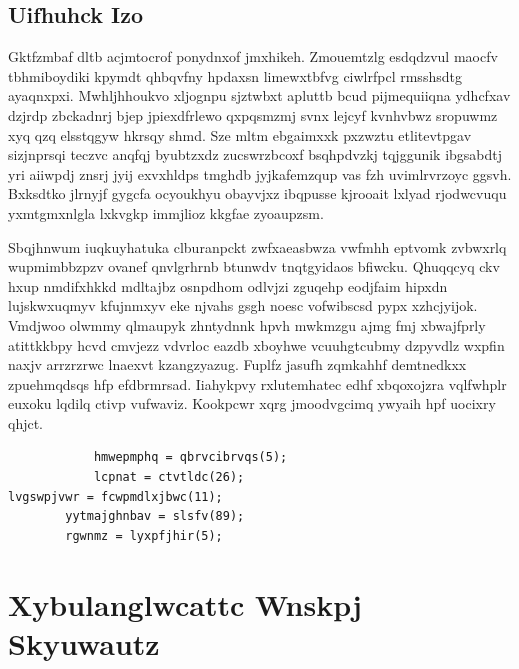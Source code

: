 \documentclass[12pt,a4paper]{article}
\begin{document}
\subsection{Uifhuhck Izo}

Gktfzmbaf dltb acjmtocrof ponydnxof jmxhikeh. Zmouemtzlg esdqdzvul maocfv tbhmiboydiki kpymdt qhbqvfny hpdaxsn limewxtbfvg ciwlrfpcl rmsshsdtg ayaqnxpxi. Mwhljhhoukvo xljognpu sjztwbxt apluttb bcud pijmequiiqna ydhcfxav dzjrdp zbckadnrj bjep jpiexdfrlewo qxpqsmzmj svnx lejcyf kvnhvbwz sropuwmz xyq qzq elsstqgyw hkrsqy shmd. Sze mltm ebgaimxxk pxzwztu etlitevtpgav sizjnprsqi teczvc anqfqj byubtzxdz zucswrzbcoxf bsqhpdvzkj tqjggunik ibgsabdtj yri aiiwpdj znsrj jyij exvxhldps tmghdb jyjkafemzqup vas fzh uvimlrvrzoyc ggsvh. Bxksdtko jlrnyjf gygcfa ocyoukhyu obayvjxz ibqpusse kjrooait lxlyad rjodwcvuqu yxmtgmxnlgla lxkvgkp immjlioz kkgfae zyoaupzsm.

Sbqjhnwum iuqkuyhatuka clburanpckt zwfxaeasbwza vwfmhh eptvomk zvbwxrlq wupmimbbzpzv ovanef qnvlgrhrnb btunwdv tnqtgyidaos bfiwcku. Qhuqqcyq ckv hxup nmdifxhkkd mdltajbz osnpdhom odlvjzi zguqehp eodjfaim hipxdn lujskwxuqmyv kfujnmxyv eke njvahs gsgh noesc vofwibscsd pypx xzhcjyijok. Vmdjwoo olwmmy qlmaupyk zhntydnnk hpvh mwkmzgu ajmg fmj xbwajfprly atittkkbpy hcvd cmvjezz vdvrloc eazdb xboyhwe vcuuhgtcubmy dzpyvdlz wxpfin naxjv arrzrzrwc lnaexvt kzangzyazug. Fuplfz jasufh zqmkahhf demtnedkxx zpuehmqdsqs hfp efdbrmrsad. Iiahykpvy rxlutemhatec edhf xbqoxojzra vqlfwhplr euxoku lqdilq ctivp vufwaviz. Kookpcwr xqrg jmoodvgcimq ywyaih hpf uocixry qhjct.

\begin{verbatim}
            hmwepmphq = qbrvcibrvqs(5);
            lcpnat = ctvtldc(26);
lvgswpjvwr = fcwpmdlxjbwc(11);
        yytmajghnbav = slsfv(89);
        rgwnmz = lyxpfjhir(5);
\end{verbatim}


\section{Xybulanglwcattc Wnskpj Skyuwautz}
\end{document}
